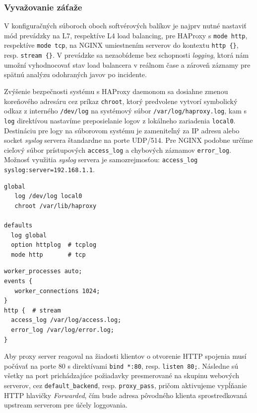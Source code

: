 \documentclass[12pt, a4paper]{article}
\begin{document}
\subsubsection{Vyvažovanie záťaže}
V konfiguračných súboroch oboch softvérových balíkov je najprv nutné nastaviť mód prevádzky na L7, 
respektíve L4 load balancing, pre HAProxy s \verb|mode http|, respektíve \verb|mode tcp|, na NGINX 
umiestnením serverov do kontextu \verb|http {}|, resp. \verb|stream {}|. V prevádzke sa nezaobídeme bez 
schopnosti \emph{logging}, ktorá nám umožní vyhodnocovať stav load balancera v reálnom čase a zároveň 
záznamy pre spätnú analýzu odohraných javov po incidente. 

Zvýšenie bezpečnosti systému s HAProxy daemonom sa dosiahne zmenou koreňového adresáru cez príkaz
\verb|chroot|, ktorý predvolene vytvorí symbolický odkaz z interného \verb|/dev/log| na systémový súbor 
\verb|/var/log/haproxy.log|, kam s \verb|log| direktívou nastavíme preposielanie logov z lokálneho 
zariadenia \verb|local0|. Destináciu pre logy na súborovom systému je zameniteľný za IP adresu alebo  
socket \emph{syslog} servera štandardne na porte UDP/514. Pre NGINX podobne určíme cieľový súbor 
prístupových \verb|access_log| a chybových záznamov \verb|error_log|. Možnosť využitia
\emph{syslog} servera je samozrejmosťou: \verb|access_log syslog:server=192.168.1.1|.

\noindent\begin{minipage}{.48\textwidth}
\begin{lstlisting}[caption=HAProxy mód prevádzky a logging]
global
   log /dev/log local0
   chroot /var/lib/haproxy

defaults
  log global
  option httplog  # tcplog
  mode http       # tcp
\end{lstlisting}
\end{minipage}\hfill
\begin{minipage}{.48\textwidth}
\begin{lstlisting}[caption=NGINX mód prevádzky a logging]
worker_processes auto;
events {
   worker_connections 1024;
}
http {  # stream
  access_log /var/log/access.log;
  error_log /var/log/error.log;
}
\end{lstlisting}
\end{minipage}

Aby proxy server reagoval na žiadosti klientov o otvorenie HTTP spojenia musí počúvať na porte 80 
s direktívami \verb|bind *:80|, resp. \verb|listen 80;|. Následne sú všetky na port prichádzajúce 
požiadavky presmerované na skupinu webových serverov, cez \verb|default_backend|, resp. \verb|proxy_pass|, 
pričom aktivujeme vypĺňanie HTTP hlavičky \emph{Forwarded}, čím bude adresa pôvodného klienta 
sprostredkovaná upstream serverom pre účely loggovania.
\end{document}
